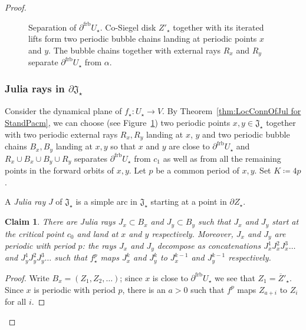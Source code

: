 \documentclass[]{amsart}
\newcommand\Jul{{\mathfrak J}}
\newcommand{\str}{{\star}}
\newcommand\frb{{\operatorname{frb}}}
\newtheorem{claim3}{Claim}
\theoremstyle{remark}
\numberwithin{equation}{section}
\theoremstyle{definition}
\begin{document}
\begin{proof}
\begin{figure}[t!]
\caption{Separation of $\partial ^\frb U_\str$. Co-Siegel disk $Z'_\str$ together with its iterated lifts form two periodic bubble chains landing at periodic points $x$ and $y$. The bubble chains together with external rays $R_x$ and $R_y$  separate $\partial ^\frb U_\str$ from $\alpha$.}
 \label{Fig:SiegPacm:SepForbSector}
\end{figure}

\subsubsection{Julia rays in {$\partial \Jul_{\str}$}}
\label{ss:InnerRays}
Consider the dynamical plane of $f_\str: U_{\str}\to V$. By Theorem~\ref{thm:LocConnOfJul for StandPacm}, we can choose (see Figure~\ref{Fig:SiegPacm:SepForbSector}) two periodic points $x,y \in \Jul_{\str}$ together with two periodic external rays $R_x,R_y$ landing at $x$, $y$ and two periodic bubble chains $B_x,B_y$ landing at $x,y$ so that $x$ and $y$ are close to $\partial^\frb U_\str$ and $R_x\cup B_x\cup B_y\cup R_y$ separates $\partial ^\frb U_\str$ from $c_1$ as well as from all the remaining points in the forward orbits of $x,y$. Let $p$ be a common period of $x,y$. Set $K\coloneqq 4p$.

A \emph{Julia ray} $J$ of $\Jul_{\str}$ is a simple arc in $\Jul_{\str}$ starting at a point in $\partial Z_{\str}$.


\begin{claim3}
\label{clm3:IxIy}
There are Julia rays $J_x\subset B_x$ and $J_y\subset B_y$ such that $J_x$ and $J_y$ start at the critical point $c_0$ and land at $x$ and $y$ respectively. Moreover, $J_x$ and $J_y$ are periodic with period $p$: the rays $J_x$ and $J_y$ decompose as concatenations $J_{x}^{1}J_{x}^{2}J_{x}^{3}\dots$ and $J_{y}^{1}J_{y}^{2}J_{y}^{3}\dots $ such that $f^p_\str$ maps $J_{x}^{k}$ and $J_{y}^{k}$ to $J_{x}^{k-1}$ and $J_{y}^{k-1}$ respectively.
 \end{claim3}
\begin{proof}
Write $B_x=(Z_1, Z_2,\dots )$; since $x$ is close to $\partial ^\frb U_\str$ we see that $Z_1=\overline Z'_\str$. Since $x$ is periodic with period $p$, there is an $a>0$ such that $f^p$ maps $Z_{a+i}$ to $Z_i$ for all $i$.


\end{proof}
\end{proof}
\end{document}
